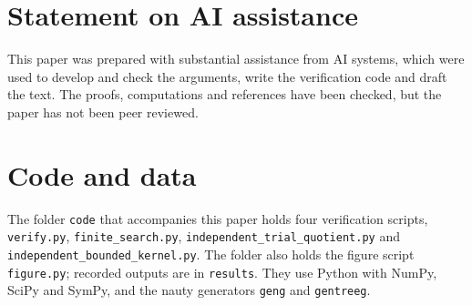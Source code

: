 \documentclass[11pt,a4paper]{article}
\theoremstyle{definition}
\begin{document}
\section*{Statement on AI assistance}
This paper was prepared with substantial assistance from AI systems, which were used to develop and check the arguments, write the verification code and draft the text. The proofs, computations and references have been checked, but the paper has not been peer reviewed.

\section*{Code and data}
The folder \texttt{code} that accompanies this paper holds four verification scripts, \texttt{verify.py}, \texttt{finite\_search.py}, \texttt{independent\_trial\_quotient.py} and \nolinkurl{independent_bounded_kernel.py}. The folder also holds the figure script \texttt{figure.py}; recorded outputs are in \texttt{results}. They use Python with NumPy, SciPy and SymPy, and the nauty generators \texttt{geng} and \texttt{gentreeg}.
\end{document}
